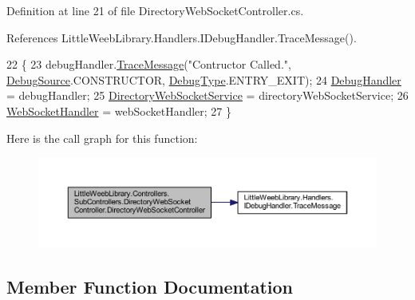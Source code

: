 Definition at line 21 of file Directory\+Web\+Socket\+Controller.\+cs.



References Little\+Weeb\+Library.\+Handlers.\+I\+Debug\+Handler.\+Trace\+Message().


\begin{DoxyCode}
22         \{
23             debugHandler.\mbox{\hyperlink{interface_little_weeb_library_1_1_handlers_1_1_i_debug_handler_a2e405bc3492e683cd3702fae125221bc}{TraceMessage}}(\textcolor{stringliteral}{"Contructor Called."}, 
      \mbox{\hyperlink{namespace_little_weeb_library_1_1_handlers_a2a6ca0775121c9c503d58aa254d292be}{DebugSource}}.CONSTRUCTOR, \mbox{\hyperlink{namespace_little_weeb_library_1_1_handlers_ab66019ed40462876ec4e61bb3ccb0a62}{DebugType}}.ENTRY\_EXIT);
24             \mbox{\hyperlink{class_little_weeb_library_1_1_handlers_1_1_debug_handler}{DebugHandler}} = debugHandler;
25             \mbox{\hyperlink{class_little_weeb_library_1_1_services_1_1_directory_web_socket_service}{DirectoryWebSocketService}} = directoryWebSocketService;
26             \mbox{\hyperlink{class_little_weeb_library_1_1_handlers_1_1_web_socket_handler}{WebSocketHandler}} = webSocketHandler;
27         \}
\end{DoxyCode}
Here is the call graph for this function\+:\nopagebreak
\begin{figure}[H]
\begin{center}
\leavevmode
\includegraphics[width=350pt]{class_little_weeb_library_1_1_controllers_1_1_sub_controllers_1_1_directory_web_socket_controller_a46e3ddc55aed91ecf9ecf4e8b6849aa8_cgraph}
\end{center}
\end{figure}


\subsection{Member Function Documentation}
\mbox{\label{class_little_weeb_library_1_1_controllers_1_1_sub_controllers_1_1_directory_web_socket_controller_a2db42c05c620f5658a5b6e473581f84c}} 
